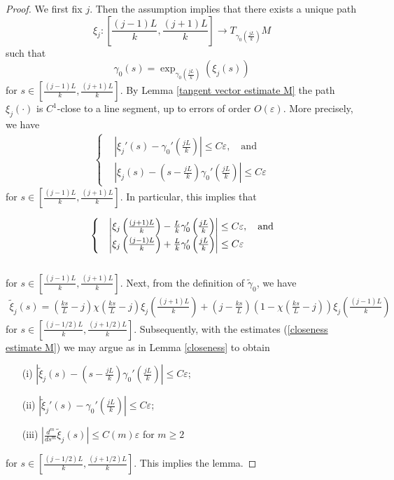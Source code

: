 \documentclass[a4paper, reqno]{amsart}
\theoremstyle{definition}
\theoremstyle{remark}
\numberwithin{equation}{section}
\numberwithin{equation}{section}
\numberwithin{equation}{section}
\begin{document}
\begin{proof}
We first fix $j$. Then the assumption implies that there exists a unique path 
\[\xi_j: \left[\frac{(j - 1)L}{k}, \frac{(j + 1)L}{k}\right]\to T_{\gamma_0\left(\frac{jL}{k}\right)}M\]
such that
\[ \gamma_0(s) = \exp_{\gamma_0\left(\frac{jL}{k}\right)}(\xi_j(s))\]
for $s\in \left[\frac{(j - 1)L}{k}, \frac{(j + 1)L}{k}\right]$. 	 By Lemma \ref{tangent vector estimate M} the path $\xi_j(\cdot)$ is $C^1$-close to a line segment, up to errors of order $O(\varepsilon)$. More precisely, we have 	
\begin{align*}
	\begin{cases}
			&\left|\xi_j'(s) -\gamma_0'\left(\frac{jL}{k}\right)\right|\leq C\varepsilon,\quad\text{and}\\
			&\left| \xi_j(s) - \left(s - \frac{jL}{k}\right)\gamma_0'\left(\frac{jL}{k}\right) \right| \leq C\varepsilon	
	\end{cases}
\end{align*}
for $s\in \left[\frac{(j-1) L}{k}, \frac{(j + 1)L}{k}\right]$. In particular, this implies that

\begin{equation}{\label{closeness estimate M}}
\begin{cases}
&\left| \xi_j\left(\frac{(j+1)L}{k}\right)  -  \frac{L}{k}\gamma_0'\left(\frac{jL}{k}\right) \right| \leq C\varepsilon,\quad\text{and}\\
&\left| \xi_j\left(\frac{(j-1)L}{k}\right)  +  \frac{L}{k}\gamma_0'\left(\frac{jL}{k}\right) \right| \leq C\varepsilon
\end{cases}
\end{equation}\\
for  $s\in \left[\frac{(j-1)L}{k}, \frac{(j+1)L}{k} \right]$.  Next, from the definition of $\tilde{\gamma}_0$, we have
\begin{align*}
	\tilde{\xi}_j(s) = \left(\frac{ks}{L} - j\right)\chi\left(\frac{ks}{L} - j\right) \xi_j\left(\frac{(j+1)L}{k}\right) + \left( j - \frac{ks}{L} \right)\left( 1 -\chi\left(\frac{ks}{L} - j\right)\right) \xi_j\left(\frac{(j-1)L}{k}\right)
\end{align*}
for  $s\in \left[\frac{(j-1/2)L}{k}, \frac{(j+1/2)L}{k} \right]$. 
Subsequently, with the estimates (\ref{closeness estimate M}) we may argue as in Lemma \ref{closeness} to obtain \\

\begin{itemize}
	\item[(i)]	$\left|\tilde{\xi}_j(s) - \left(s - \frac{jL}{k}\right)\gamma_0'\left(\frac{jL}{k}\right)\right|\leq C\varepsilon$;
	\item[(ii)] $\left|\tilde{\xi}_j'(s) - \gamma_0'\left(\frac{jL}{k}\right)\right|\leq C\varepsilon$;
	\item[(iii)] $\left|\frac{d^m}{ds^m} \tilde{\xi}_j(s)\right|\leq C(m) \varepsilon$ for $m\geq 2$
\end{itemize}
for  $s\in \left[\frac{(j-1/2)L}{k}, \frac{(j+1/2)L}{k} \right]$. This implies the lemma.
\end{proof}
\end{document}
